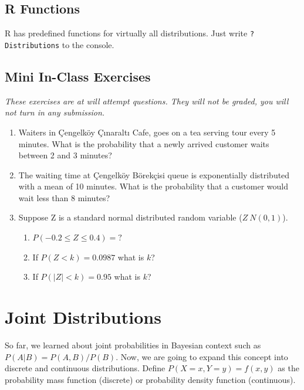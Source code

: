 \documentclass[]{book}
\providecommand{\tightlist}{%
  \setlength{\itemsep}{0pt}\setlength{\parskip}{0pt}}
\theoremstyle{definition}
\theoremstyle{definition}
\theoremstyle{definition}
\theoremstyle{remark}
\begin{document}
\hypertarget{r-functions}{%
\section{R Functions}\label{r-functions}}

R has predefined functions for virtually all distributions. Just write
\texttt{?Distributions} to the console.

\hypertarget{mini-in-class-exercises}{%
\section{Mini In-Class Exercises}\label{mini-in-class-exercises}}

\emph{These exercises are at will attempt questions. They will not be
graded, you will not turn in any submission.}

\begin{enumerate}
\def\labelenumi{\arabic{enumi}.}
\item
  Waiters in Çengelköy Çınaraltı Cafe, goes on a tea serving tour every
  5 minutes. What is the probability that a newly arrived customer waits
  between 2 and 3 minutes?
\item
  The waiting time at Çengelköy Börekçisi queue is exponentially
  distributed with a mean of 10 minutes. What is the probability that a
  customer would wait less than 8 minutes?
\item
  Suppose Z is a standard normal distributed random variable
  (\(Z ~ N(0,1)\)).

  \begin{enumerate}
  \def\labelenumii{\alph{enumii}.}
  \tightlist
  \item
    \(P(-0.2 \le Z \le 0.4) = ?\)
  \item
    If \(P(Z < k) = 0.0987\) what is \(k\)?
  \item
    If \(P(|Z| < k) = 0.95\) what is \(k\)?
  \end{enumerate}
\end{enumerate}

\hypertarget{joint-distributions}{%
\chapter{Joint Distributions}\label{joint-distributions}}

So far, we learned about joint probabilities in Bayesian context such as
\(P(A|B) = P(A,B)/P(B)\). Now, we are going to expand this concept into
discrete and continuous distributions. Define \(P(X = x, Y=y) = f(x,y)\)
as the probability mass function (discrete) or probability density
function (continuous).
\end{document}
